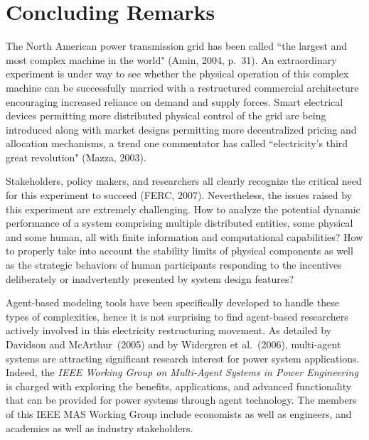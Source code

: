 \documentclass[12pt]{article}
\begin{document}

\section{Concluding Remarks \label{Conclusion}}


The North American power transmission grid has been called ``the largest and most complex machine in the world" (Amin, 2004, p.~31).  An extraordinary experiment is under way to see whether the physical operation of this complex machine can be successfully married with a restructured commercial architecture encouraging increased reliance on demand and supply forces.  Smart electrical devices permitting more distributed physical control of the grid are being introduced along with market designs permitting more decentralized pricing and allocation mechanisms, a trend one commentator has called ``electricity's third great revolution" (Mazza, 2003).

Stakeholders, policy makers, and researchers all clearly recognize the critical need for this experiment to succeed (FERC, 2007).  Nevertheless, the issues raised by this experiment are extremely challenging.  How to analyze the potential dynamic performance of a system comprising multiple distributed entities, some physical and some human, all with finite information and computational capabilities?  How to properly take into account the stability limits of physical components as well as the strategic behaviors of human participants responding to the incentives deliberately or inadvertently presented by system design features?

Agent-based modeling tools have been specifically developed to handle these types of complexities, hence it is
not surprising to find agent-based researchers actively involved in this electricity restructuring movement.  As detailed by Davidson and McArthur~(2005) and by Widergren et al.~(2006), multi-agent systems are attracting significant research interest for power system applications.  Indeed, the \textit{IEEE Working Group on Multi-Agent Systems in Power Engineering\/} is charged with exploring the benefits, applications, and advanced functionality that can be provided for power systems through agent technology. The members of this IEEE MAS Working Group include economists as well as engineers, and academics as well as industry stakeholders.  
\end{document}
